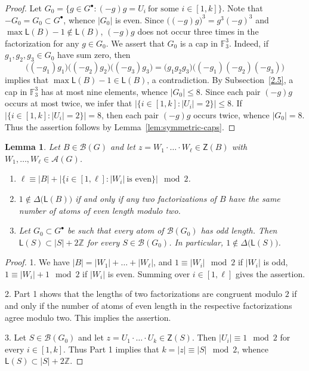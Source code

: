 \documentclass[a4paper, 10pt]{amsart}
\theoremstyle{plain}
\newtheorem{lemma}[theorem]{\bf Lemma}
\theoremstyle{definition}
\theoremstyle{definition}
\newcommand{\Z}{\mathbb Z}
\newcommand{\F}{\mathbb F}
\numberwithin{equation}{section}
\begin{document}
\begin{proof}
Let $G_0 = \{ g \in G^{\bullet} \colon (-g)g = U_i \ \text{for some $i \in [1,k]$} \}$. Note that $-G_0 = G_0 \subset G^{\bullet}$, whence $|G_0|$ is even.  Since  $\big( (-g)g \big)^3 = g^3 (-g)^3$ and $\max\mathsf L(B)-1\notin\mathsf L(B)$,  $(-g)g$ does not occur three times in the factorization for any $g \in G_0$. We assert that  $G_0$ is a cap in $\F_3^3$. Indeed, if $g_1, g_2, g_3 \in G_0$ have sum zero, then 
\[
\big( (-g_1)g_1 \big) \big( (-g_2)g_2 \big) \big( (-g_3)g_3 \big) = \big(g_1g_2g_3 \big) \big((-g_1)(-g_2)(-g_3) \big)
\]
implies that $\max \mathsf L (B)-1 \in \mathsf L (B)$, a contradiction. By Subsection~\ref{2.5}, a cap in $\F_3^3$
has at most nine elements, whence $|G_0|\le 8$. Since each pair $(-g)g$ occurs at most twice, we infer that $|\{i \in [1,k] \colon |U_i|=2\}| \le 8$. If $|\{i \in [1,k] \colon |U_i|=2\}| = 8$, then each pair $(-g)g$ occurs twice, whence
$|G_0| = 8$.  Thus the assertion follows by  Lemma~\ref{lem:symmetric-caps}.
\end{proof}


\begin{lemma} \label{lem:parity-formula}
Let $B \in \mathcal B (G)$ and let
$z = W_1 \cdot \ldots \cdot W_{\ell} \in \mathsf Z (B)$ with
$W_1, \ldots, W_{\ell} \in \mathcal A (G)$.
\begin{enumerate}
\item $\ell \equiv |B| + \bigl|\{ i \in [1,\ell] \colon |W_i| \ \text{is even}\}\bigr| \mod 2$.
\item $1 \notin \Delta \big(\mathsf L (B) \big)$ if and only if any two factorizations
      of $B$ have the same number of atoms of even length modulo two.
\item Let $G_0 \subset G^{\bullet}$ be such that every atom of
      $\mathcal B (G_0)$ has odd length.  Then
      $\mathsf L (S) \subset |S| + 2\Z$ for every $S \in \mathcal B (G_0)$.
      In particular, $1 \notin \Delta \big(\mathsf L (S) \big)$.
\end{enumerate}
\end{lemma}

\begin{proof}
1. We have $|B| = |W_1| + \ldots + |W_{\ell}|$, and $1 \equiv |W_i| \mod 2$ if
$|W_i|$ is odd, $1 \equiv |W_i| + 1 \mod 2$ if $|W_i|$ is even.  Summing
over $i \in [1,\ell]$ gives the assertion.

2. Part 1 shows that the lengths of two factorizations are congruent modulo $2$ if and
only if the number of atoms of even length in the respective factorizations agree modulo two. This implies the assertion.

3. Let $S \in \mathcal B (G_0)$ and let $z = U_1 \cdot \ldots \cdot U_k \in \mathsf Z (S)$.  Then $|U_i| \equiv 1 \mod 2$ for every $i \in [1,k]$.  Thus Part 1 implies that 
$k=|z| \equiv |S| \mod 2$, whence $\mathsf L (S) \subset |S| + 2\Z$.
\end{proof}
\end{document}
